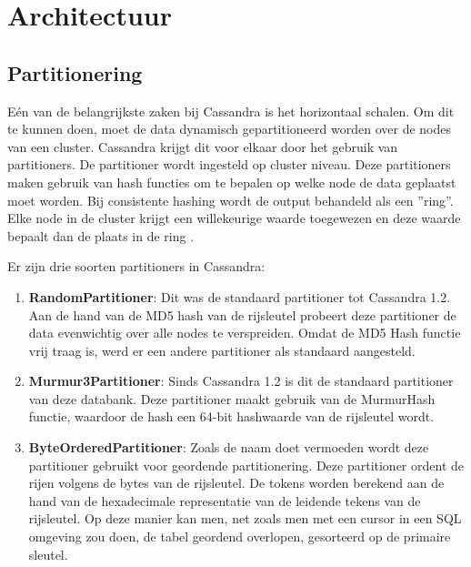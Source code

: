\chapter{Architectuur}
\label{ch:cassandra_architectuur}

\section{Partitionering}
Eén van de belangrijkste zaken bij Cassandra is het horizontaal schalen.
Om dit te kunnen doen, moet de data dynamisch gepartitioneerd worden over de nodes van een cluster.
Cassandra krijgt dit voor elkaar door het gebruik van partitioners.
De partitioner wordt ingesteld op cluster niveau.
Deze partitioners maken gebruik van hash functies om te bepalen op welke node de data geplaatst moet worden.
Bij consistente hashing wordt de output behandeld als een ''ring''.
Elke node in de cluster krijgt een willekeurige waarde toegewezen en deze waarde bepaalt dan de plaats in de ring \citep{lakshman2010cassandra}.


Er zijn drie soorten partitioners in Cassandra:

\begin{enumerate}
	\item \textbf{RandomPartitioner}:
	Dit was de standaard partitioner tot Cassandra 1.2.
	Aan de hand van de MD5 hash van de rijsleutel probeert deze partitioner de data evenwichtig over alle nodes te verspreiden.
	Omdat de MD5 Hash functie vrij traag is, werd er een andere partitioner als standaard aangesteld.
	
	\item \textbf{Murmur3Partitioner}:
	Sinds Cassandra 1.2 is dit de standaard partitioner van deze databank.
	Deze partitioner maakt gebruik van de MurmurHash functie, waardoor de hash een 64-bit hashwaarde van de rijsleutel wordt.
	
	\item \textbf{ByteOrderedPartitioner}:
	Zoals de naam doet vermoeden wordt deze partitioner gebruikt voor geordende partitionering.
	Deze partitioner ordent de rijen volgens de bytes van de rijsleutel.
	De tokens worden berekend aan de hand van de hexadecimale representatie van de leidende tekens van de rijsleutel.
	Op deze manier kan men, net zoals men met een cursor in een SQL omgeving zou doen, de tabel geordend overlopen, gesorteerd op de primaire sleutel.
	
\end{enumerate}


